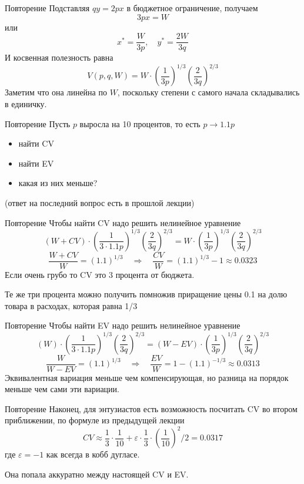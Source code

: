 \documentclass{beamer}
\begin{document}
\begin{frame}{Повторение}
Подставляя $q y = 2 p x$ в бюджетное ограничение, получаем
$$ 3 p x = W $$
или 
$$ x^* = \frac{W}{3p}, \quad y^* = \frac{2 W}{3q}$$
И косвенная полезность равна
$$ V(p,q,W) = W \cdot (\frac{1}{3p})^{1/3}(\frac{2}{3q})^{2/3}$$
Заметим что она линейна по $W$, поскольку степени с самого начала складывались в единичку.
\end{frame}

\begin{frame}{Повторение}
Пусть $p$ выросла на 10 процентов, то есть $p \to 1.1 p$
\begin{itemize}
\item найти CV
\item найти EV
\item какая из них меньше?	
\end{itemize}
(ответ на последний вопрос есть в прошлой лекции)
\end{frame}

\begin{frame}{Повторение}
Чтобы найти CV надо решить нелинейное уравнение
$$(W+CV) \cdot (\frac{1}{3\cdot 1.1 p})^{1/3}(\frac{2}{3q})^{2/3} = W \cdot (\frac{1}{3p})^{1/3}(\frac{2}{3q})^{2/3}$$
$$\frac{W+CV}{W} = (1.1)^{1/3} \quad \Rightarrow \quad \frac{CV}{W} = (1.1)^{1/3}  - 1 \approx 0.0323$$
Если очень грубо то CV это 3 процента от бюджета.

Те же три процента можно получить помножив приращение цены 0.1 на долю товара в расходах, которая равна 1/3
\end{frame}

\begin{frame}{Повторение}
Чтобы найти EV надо решить нелинейное уравнение
$$(W) \cdot (\frac{1}{3\cdot 1.1 p})^{1/3}(\frac{2}{3q})^{2/3} = (W-EV) \cdot (\frac{1}{3p})^{1/3}(\frac{2}{3q})^{2/3}$$
$$\frac{W}{W-EV} = (1.1)^{1/3} \quad \Rightarrow \quad \frac{EV}{W} = 1-(1.1)^{-1/3} \approx 0.0313$$
Эквивалентная вариация меньше чем компенсирующая, но разница на порядок меньше чем сами эти вариации.
\end{frame}

\begin{frame}{Повторение}
Наконец, для энтузиастов есть возможность посчитать CV во втором приближении, по формуле из предыдущей лекции
$$ CV \approx \frac{1}{3} \cdot \frac{1}{10} + \varepsilon \cdot \frac{1}{3} \cdot (\frac{1}{10})^2 /2 = 0.0317$$
где $\varepsilon = -1$ как всегда в кобб дугласе.

Она попала аккуратно между настоящей CV и EV.
\end{frame}
\end{document}
